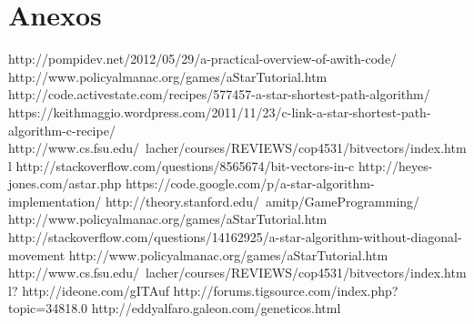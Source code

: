 \documentclass[showkeys,eqsecnum,prd,showpacs,notitlepage,12pt]{article}
\begin{document}
\section{Anexos}
\begin{thebibliography}{X}
\bibitem{}http://pompidev.net/2012/05/29/a-practical-overview-of-awith-code/
\bibitem{}http://www.policyalmanac.org/games/aStarTutorial.htm
\bibitem{}http://code.activestate.com/recipes/577457-a-star-shortest-path-algorithm/
\bibitem{}https://keithmaggio.wordpress.com/2011/11/23/c-link-a-star-shortest-path-algorithm-c-recipe/
\bibitem{}http://www.cs.fsu.edu/~lacher/courses/REVIEWS/cop4531/bitvectors/index.html
\bibitem{}http://stackoverflow.com/questions/8565674/bit-vectors-in-c
\bibitem{}http://heyes-jones.com/astar.php
\bibitem{}https://code.google.com/p/a-star-algorithm-implementation/
\bibitem{}http://theory.stanford.edu/~amitp/GameProgramming/
\bibitem{}http://www.policyalmanac.org/games/aStarTutorial.htm
\bibitem{}http://stackoverflow.com/questions/14162925/a-star-algorithm-without-diagonal-movement
\bibitem{}http://www.policyalmanac.org/games/aStarTutorial.htm
\bibitem{}http://www.cs.fsu.edu/~lacher/courses/REVIEWS/cop4531/bitvectors/index.html?%
\bibitem{}http://ideone.com/gITAuf
\bibitem{}http://forums.tigsource.com/index.php?topic=34818.0
\bibitem{}http://eddyalfaro.galeon.com/geneticos.html
\bibitem{}
\bibitem{}
\bibitem{}
\bibitem{}








\end{thebibliography}
\end{document}
